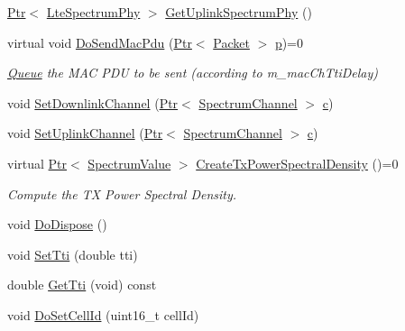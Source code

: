 \begin{DoxyCompactItemize}
\item 
\hyperlink{classns3_1_1Ptr}{Ptr}$<$ \hyperlink{classns3_1_1LteSpectrumPhy}{Lte\+Spectrum\+Phy} $>$ \hyperlink{classns3_1_1LtePhy_aa17612c41d80653ed556431eedef4304}{Get\+Uplink\+Spectrum\+Phy} ()
\item 
virtual void \hyperlink{classns3_1_1LtePhy_ad9676354b278cc44face4eaf0f1ed50f}{Do\+Send\+Mac\+Pdu} (\hyperlink{classns3_1_1Ptr}{Ptr}$<$ \hyperlink{classns3_1_1Packet}{Packet} $>$ \hyperlink{lte__link__budget__x2__handover__measures_8m_ac9de518908a968428863f829398a4e62}{p})=0
\begin{DoxyCompactList}\small\item\em \hyperlink{classns3_1_1Queue}{Queue} the M\+AC P\+DU to be sent (according to m\+\_\+mac\+Ch\+Tti\+Delay) \end{DoxyCompactList}\item 
void \hyperlink{classns3_1_1LtePhy_a7afe03d16b904a3e8373fcd7916b867b}{Set\+Downlink\+Channel} (\hyperlink{classns3_1_1Ptr}{Ptr}$<$ \hyperlink{classns3_1_1SpectrumChannel}{Spectrum\+Channel} $>$ \hyperlink{mmwave_2model_2fading-traces_2fading__trace__generator_8m_ae0323a9039add2978bf5b49550572c7c}{c})
\item 
void \hyperlink{classns3_1_1LtePhy_a800b71ebe08b3cd3b296ea810c35d216}{Set\+Uplink\+Channel} (\hyperlink{classns3_1_1Ptr}{Ptr}$<$ \hyperlink{classns3_1_1SpectrumChannel}{Spectrum\+Channel} $>$ \hyperlink{mmwave_2model_2fading-traces_2fading__trace__generator_8m_ae0323a9039add2978bf5b49550572c7c}{c})
\item 
virtual \hyperlink{classns3_1_1Ptr}{Ptr}$<$ \hyperlink{classns3_1_1SpectrumValue}{Spectrum\+Value} $>$ \hyperlink{classns3_1_1LtePhy_aa3a11800b97f2552d7a68ab56667c028}{Create\+Tx\+Power\+Spectral\+Density} ()=0
\begin{DoxyCompactList}\small\item\em Compute the TX Power Spectral Density. \end{DoxyCompactList}\item 
void \hyperlink{classns3_1_1LtePhy_a1a045f24a1aa7b3d25c0312c85c58ba4}{Do\+Dispose} ()
\item 
void \hyperlink{classns3_1_1LtePhy_af46bd02d1f1faa98d55ff9d5133ae09f}{Set\+Tti} (double tti)
\item 
double \hyperlink{classns3_1_1LtePhy_ae52a0e549222666b7ce09b83f8a6c589}{Get\+Tti} (void) const 
\item 
void \hyperlink{classns3_1_1LtePhy_a09b4acff134fce23cd8c02c511b9d7e8}{Do\+Set\+Cell\+Id} (uint16\+\_\+t cell\+Id)
\item 

\end{DoxyCompactItemize}
